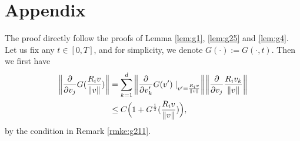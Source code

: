 \documentclass[a4paper, 11pt]{article}
\theoremstyle{plain}
\theoremstyle{remark}
\theoremstyle{definition}
\begin{document}




\section{Appendix}\label{apx:1}
The proof directly follow the proofs of Lemma \ref{lem:g1}, \ref{lem:g25} and \ref{lem:g4}. Let us fix any $t\in [0,T]$, and for simplicity, we denote $G(\cdot):=G(\cdot,t)$. Then we first have 
\begin{equation}
\begin{aligned}
    \norm{\frac{\partial}{\partial v_j}G(\frac{R_i v}{\norm{v}})}&=\sum_{k=1}^d\norm{\frac{\partial}{\partial v'_k}G(v')\mid_{v'=\frac{R_iv}{\norm{v}}}}\norm{\frac{\partial}{\partial v_j}\frac{R_iv_k}{\norm{v}}}\\
    &\leq C\Big(1+G^{\frac{1}{2}}(\frac{R_iv}{\norm{v}})\Big),
\end{aligned}
\end{equation}
by the condition in Remark \ref{rmke:g211}. 
\end{document}

